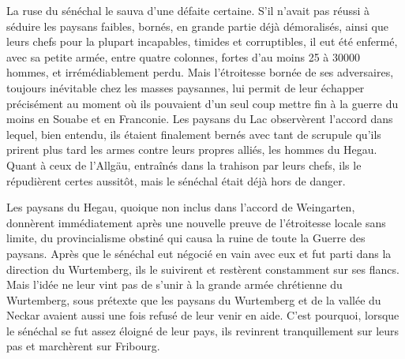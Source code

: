 \documentclass[french,twoside]{book} %
\begin{document}
La ruse du sénéchal le sauva d’une défaite certaine. S’il n’avait pas réussi à séduire les paysans faibles, bornés, en grande partie déjà démoralisés, ainsi que leurs chefs pour la plupart incapables, timides et corruptibles, il eut été enfermé, avec sa petite armée, entre quatre colonnes, fortes d’au moins 25 à 30000 hommes, et irrémédiablement perdu. Mais l’étroitesse bornée de ses adversaires, toujours inévitable chez les masses paysannes, lui permit de leur échapper précisément au moment où ils pouvaient d’un seul coup mettre fin à la guerre du moins en Souabe et en Franconie. Les paysans du Lac observèrent l’accord dans lequel, bien entendu, ils étaient finalement bernés avec tant de scrupule qu’ils prirent plus tard les armes contre leurs propres alliés, les hommes du Hegau. Quant à ceux de l’Allgäu, entraînés dans la trahison par leurs chefs, ils le répudièrent certes aussitôt, mais le sénéchal était déjà hors de danger.\par
Les paysans du Hegau, quoique non inclus dans l’accord de Weingarten, donnèrent immédiatement après une nouvelle preuve de l’étroitesse locale sans limite, du provincialisme obstiné qui causa la ruine de toute la Guerre des paysans. Après que le sénéchal eut négocié en vain avec eux et fut parti dans la direction du Wurtemberg, ils le suivirent et restèrent constamment sur ses flancs. Mais l’idée ne leur vint pas de s’unir à la grande armée chrétienne du Wurtemberg, sous prétexte que les paysans du Wurtemberg et de la vallée du Neckar avaient aussi une fois refusé de leur venir en aide. C’est pourquoi, lorsque le sénéchal se fut assez éloigné de leur pays, ils revinrent tranquillement sur leurs pas et marchèrent sur Fribourg.\par
\end{document}
